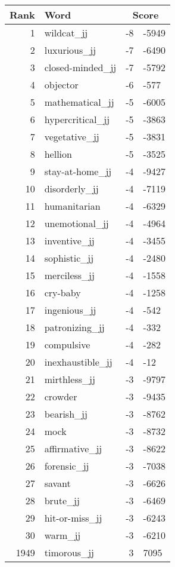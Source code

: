 \begin{longtable}[!htbp]{| rlr@{.}l |}
    \hline
    \textbf{Rank} & \textbf{Word} & \multicolumn{2}{c|}{\textbf{Score}} \\
    \hline
    \endhead
    1 & wildcat\_jj & -8 & -5949 \\
    2 & luxurious\_jj & -7 & -6490 \\
    3 & closed-minded\_jj & -7 & -5792 \\
    4 & objector & -6 & -577 \\
    5 & mathematical\_jj & -5 & -6005 \\
    6 & hypercritical\_jj & -5 & -3863 \\
    7 & vegetative\_jj & -5 & -3831 \\
    8 & hellion & -5 & -3525 \\
    9 & stay-at-home\_jj & -4 & -9427 \\
    10 & disorderly\_jj & -4 & -7119 \\
    11 & humanitarian & -4 & -6329 \\
    12 & unemotional\_jj & -4 & -4964 \\
    13 & inventive\_jj & -4 & -3455 \\
    14 & sophistic\_jj & -4 & -2480 \\
    15 & merciless\_jj & -4 & -1558 \\
    16 & cry-baby & -4 & -1258 \\
    17 & ingenious\_jj & -4 & -542 \\
    18 & patronizing\_jj & -4 & -332 \\
    19 & compulsive & -4 & -282 \\
    20 & inexhaustible\_jj & -4 & -12 \\
    21 & mirthless\_jj & -3 & -9797 \\
    22 & crowder & -3 & -9435 \\
    23 & bearish\_jj & -3 & -8762 \\
    24 & mock & -3 & -8732 \\
    25 & affirmative\_jj & -3 & -8622 \\
    26 & forensic\_jj & -3 & -7038 \\
    27 & savant & -3 & -6626 \\
    28 & brute\_jj & -3 & -6469 \\
    29 & hit-or-miss\_jj & -3 & -6243 \\
    30 & warm\_jj & -3 & -6210 \\
    1949 & timorous\_jj & 3 & 7095 \\

\end{longtable}
